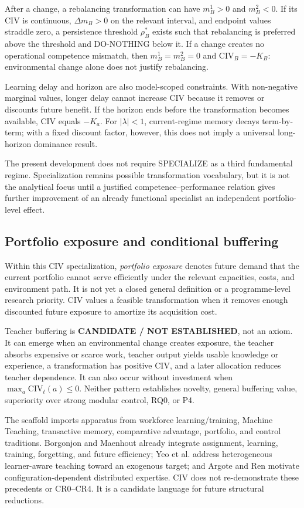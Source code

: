 After a change, a rebalancing transformation can have $m_B^1>0$ and $m_B^2<0$. If its CIV is continuous, $\Delta m_B>0$ on the relevant interval, and endpoint values straddle zero, a persistence threshold $\rho_B^*$ exists such that rebalancing is preferred above the threshold and DO-NOTHING below it. If a change creates no operational competence mismatch, then $m_B^1=m_B^2=0$ and $\mathrm{CIV}_B=-K_B$: environmental change alone does not justify rebalancing.

Learning delay and horizon are also model-scoped constraints. With non-negative marginal values, longer delay cannot increase CIV because it removes or discounts future benefit. If the horizon ends before the transformation becomes available, CIV equals $-K_a$. For $|\lambda|<1$, current-regime memory decays term-by-term; with a fixed discount factor, however, this does not imply a universal long-horizon dominance result.

The present development does not require SPECIALIZE as a third fundamental regime. Specialization remains possible transformation vocabulary, but it is not the analytical focus until a justified competence--performance relation gives further improvement of an already functional specialist an independent portfolio-level effect.

\subsection{Portfolio exposure and conditional buffering}

Within this CIV specialization, \emph{portfolio exposure} denotes future demand that the current portfolio cannot serve efficiently under the relevant capacities, costs, and environment path. It is not yet a closed general definition or a programme-level research priority. CIV values a feasible transformation when it removes enough discounted future exposure to amortize its acquisition cost.

Teacher buffering is \textbf{CANDIDATE / NOT ESTABLISHED}, not an axiom. It can emerge when an environmental change creates exposure, the teacher absorbs expensive or scarce work, teacher output yields usable knowledge or experience, a transformation has positive CIV, and a later allocation reduces teacher dependence. It can also occur without investment when $\max_a\mathrm{CIV}_t(a)\leq0$. Neither pattern establishes novelty, general buffering value, superiority over strong modular control, RQ0, or P4.

The scaffold imports apparatus from workforce learning/training, Machine Teaching, transactive memory, comparative advantage, portfolio, and control traditions. Borgonjon and Maenhout already integrate assignment, learning, training, forgetting, and future efficiency; Yeo et al. address heterogeneous learner-aware teaching toward an exogenous target; and Argote and Ren motivate configuration-dependent distributed expertise. CIV does not re-demonstrate these precedents or CR0--CR4. It is a candidate language for future structural reductions.
